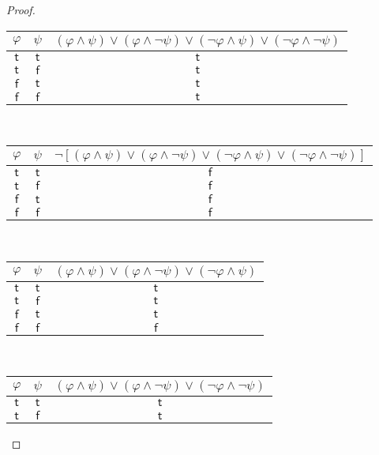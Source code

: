 \documentclass[12pt]{article}
\begin{document}
\begin{proof}
    \begin{center}
        \begin{tabular}{cc|c}
            $\varphi$ & $\psi$ & $(\varphi \land \psi) \lor (\varphi \land \neg \psi) \lor (\neg \varphi \land \psi) \lor (\neg \varphi \land \neg \psi)$ \\ \hline
            $\mathsf{t}$ & $\mathsf{t}$ & $\mathsf{t}$ \\
            $\mathsf{t}$ & $\mathsf{f}$ & $\mathsf{t}$ \\
            $\mathsf{f}$ & $\mathsf{t}$ & $\mathsf{t}$ \\
            $\mathsf{f}$ & $\mathsf{f}$ & $\mathsf{t}$ \\
        \end{tabular}
        ~~
        \begin{tabular}{cc|c}
            $\varphi$ & $\psi$ & $\neg [(\varphi \land \psi) \lor (\varphi \land \neg \psi) \lor (\neg \varphi \land \psi) \lor (\neg \varphi \land \neg \psi)]$ \\ \hline
            $\mathsf{t}$ & $\mathsf{t}$ & $\mathsf{f}$ \\
            $\mathsf{t}$ & $\mathsf{f}$ & $\mathsf{f}$ \\
            $\mathsf{f}$ & $\mathsf{t}$ & $\mathsf{f}$ \\
            $\mathsf{f}$ & $\mathsf{f}$ & $\mathsf{f}$ \\
        \end{tabular}
        ~~
        \begin{tabular}{cc|c}
            $\varphi$ & $\psi$ & $(\varphi \land \psi) \lor (\varphi \land \neg \psi) \lor (\neg \varphi \land \psi)$ \\ \hline
            $\mathsf{t}$ & $\mathsf{t}$ & $\mathsf{t}$ \\
            $\mathsf{t}$ & $\mathsf{f}$ & $\mathsf{t}$ \\
            $\mathsf{f}$ & $\mathsf{t}$ & $\mathsf{t}$ \\
            $\mathsf{f}$ & $\mathsf{f}$ & $\mathsf{f}$ \\
        \end{tabular}
        ~~
        \begin{tabular}{cc|c}
            $\varphi$ & $\psi$ & $(\varphi \land \psi) \lor (\varphi \land \neg \psi) \lor (\neg \varphi \land \neg \psi)$ \\ \hline
            $\mathsf{t}$ & $\mathsf{t}$ & $\mathsf{t}$ \\
            $\mathsf{t}$ & $\mathsf{f}$ & $\mathsf{t}$ \\

\end{tabular}
\end{center}
\end{proof}
\end{document}

